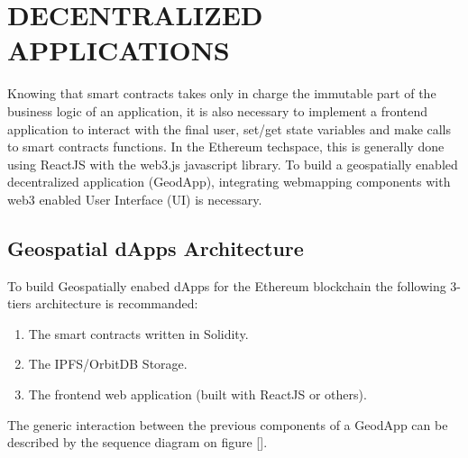 \documentclass{isprs} %
\begin{document}
\newpage
\section{DECENTRALIZED APPLICATIONS}\label{sec:DECENTRALIZED APPLICATIONS}

Knowing that smart contracts takes only in charge the immutable part of the business logic of an application, it is also necessary to implement a frontend application to interact with the final user, set/get state variables and make calls to smart contracts functions. In the Ethereum techspace, this is generally done using ReactJS with the web3.js javascript library. To build a geospatially enabled decentralized application (GeodApp), integrating webmapping components with web3 enabled User Interface (UI) is necessary.
 
\subsection{Geospatial dApps Architecture}\label{sec:Geospatial dApps Architecture}

To build Geospatially enabed dApps for the Ethereum blockchain the following 3-tiers architecture is recommanded:

\begin{enumerate}
\setlength\itemsep{0em}\setlength\parskip{0em}\setlength\topsep{0em}\setlength\partopsep{0em}\setlength\parsep{0em} 
\item{The smart contracts written in Solidity.} 
\item{The IPFS/OrbitDB Storage.}
\item{The frontend web application (built with ReactJS or others).}
\end{enumerate}

The generic interaction between the previous components of a GeodApp can be described by the sequence diagram on figure [].
\end{document}
